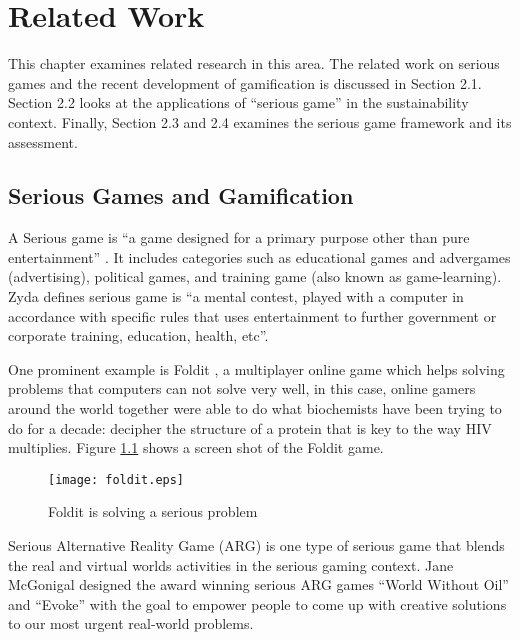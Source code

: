 \chapter{Related Work}
\label{cha:related-work}

This chapter examines related research in this area. The related work on serious games and the recent development of gamification is discussed in Section 2.1. Section 2.2 looks at the applications of ``serious game'' in the sustainability context. Finally, Section 2.3 and 2.4 examines the serious game framework and its assessment.

\section {Serious Games and Gamification}

A Serious game is ``a game designed for a primary purpose other than pure entertainment'' \cite {WikipediaSeriousGame}. It includes categories such as educational games and advergames (advertising), political games, and training game (also known as game-learning). Zyda \cite{Zyda2005} defines serious game is ``a mental contest, played with a computer in accordance with specific rules that uses entertainment to further government or corporate training, education, health, etc''.

One prominent example is Foldit \cite {khatib2011crystal}, a multiplayer online game which helps solving problems that computers can not solve very well, in this case, online gamers around the world together were able to do what biochemists have been trying to do for a decade: decipher the structure of a protein that is key to the way HIV multiplies. Figure \ref{fig:foldit} shows a screen shot of the Foldit game.

\begin{figure}[htbp]
	\centering
		\texttt{[image: foldit.eps]}
		\caption{Foldit is solving a serious problem}
		\label{fig:foldit}
\end{figure}

Serious Alternative Reality Game (ARG) is one type of serious game that blends the real and virtual worlds activities in the serious gaming context. Jane McGonigal designed the award winning serious ARG games ``World Without Oil'' \cite{worldwithoutoil} and ``Evoke'' \cite{urgentevoke} with the goal to empower people to come up with creative solutions to our most urgent real-world problems. 

